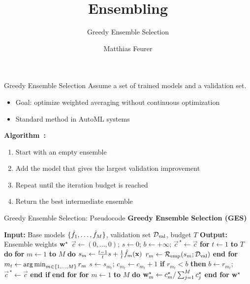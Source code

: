 \documentclass[main]{subfiles}
\title[AutoML: Ensembling]{Ensembling}
\subtitle{Greedy Ensemble Selection}
\author[Matthias Feurer]{Matthias Feurer}
\date{}
\begin{document}
\maketitle

\begin{frame}{Greedy Ensemble Selection}
Assume a set of trained models and a validation set.
\begin{itemize}
    \item Goal: optimize weighted averaging without continuous optimization
    \item Standard method in AutoML systems~
\end{itemize}
\vspace{0.2cm}
\textbf{Algorithm~:}
\begin{enumerate}
    \item Start with an empty ensemble
    \item Add the model that gives the largest validation improvement
    \item Repeat until the iteration budget is reached
    \item Return the best intermediate ensemble
\end{enumerate}
\end{frame}

\begin{frame}{Greedy Ensemble Selection: Pseudocode}
\scriptsize
\textbf{Greedy Ensemble Selection (GES)}
\begin{algorithmic}[1]
\State \textbf{Input:} Base models $\{\bl[1],\ldots,\bl[M]\}$, validation set $\datasetval$, budget $T$
\State \textbf{Output:} Ensemble weights $\ensweights^\star$
\State $\vec{c} \gets (0,\ldots,0)$; $s \gets 0$; $b \gets +\infty$; $\vec{c}^{\,\star} \gets \vec{c}$
\State \textbf{for} $t \gets 1$ \textbf{to} $T$ \textbf{do}
\State \hspace{1em}\textbf{for} $m \gets 1$ \textbf{to} $M$ \textbf{do}
\State \hspace{2em}$s_m \gets \frac{t-1}{t} s + \frac{1}{t}\bl[m](\x)$
\State \hspace{2em}$r_m \gets \riske(s_m;\datasetval)$
\State \hspace{1em}\textbf{end for}
\State \hspace{1em}$m_t \gets \argmin_{m \in \{1,\ldots,M\}} r_m$
\State \hspace{1em}$s \gets s_{m_t}$; $c_{m_t} \gets c_{m_t} + 1$
\State \hspace{1em}\textbf{if} $r_{m_t} < b$ \textbf{then}
\State \hspace{2em}$b \gets r_{m_t}$; $\vec{c}^{\,\star} \gets \vec{c}$
\State \hspace{1em}\textbf{end if}
\State \textbf{end for}
\State \textbf{for} $m \gets 1$ \textbf{to} $M$ \textbf{do}
\State \hspace{1em}$\ensweights^\star_m \gets c^\star_m / \sum_{j=1}^{M} c^\star_j$
\State \textbf{end for}
\State \Return $\ensweights^\star$
\end{algorithmic}
\end{frame}
\end{document}
